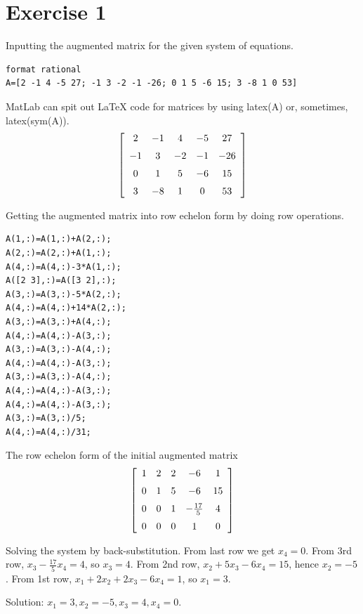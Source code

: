 \documentclass{article}
\begin{document}

\section*{Exercise 1}

Inputting the augmented matrix for the given system of equations.
\begin{verbatim}
format rational
A=[2 -1 4 -5 27; -1 3 -2 -1 -26; 0 1 5 -6 15; 3 -8 1 0 53]
\end{verbatim}
MatLab can spit out LaTeX code for matrices by using latex(A) or, sometimes, latex(sym(A)).
\begin{align*}
 \left[ \begin {array}{ccccc} 2&-1&4&-5&27\\\noalign{\medskip}-1&3&-2&-1&-26\\\noalign{\medskip}0&1&5&-6&15\\\noalign{\medskip}3&-8&1&0&53\end {array} \right] 
\end{align*}

Getting the augmented matrix into row echelon form by doing row operations.
\begin{verbatim}
A(1,:)=A(1,:)+A(2,:);
A(2,:)=A(2,:)+A(1,:);
A(4,:)=A(4,:)-3*A(1,:);
A([2 3],:)=A([3 2],:);
A(3,:)=A(3,:)-5*A(2,:);
A(4,:)=A(4,:)+14*A(2,:);
A(3,:)=A(3,:)+A(4,:);
A(4,:)=A(4,:)-A(3,:);
A(3,:)=A(3,:)-A(4,:);
A(4,:)=A(4,:)-A(3,:);
A(3,:)=A(3,:)-A(4,:);
A(4,:)=A(4,:)-A(3,:);
A(4,:)=A(4,:)-A(3,:);
A(3,:)=A(3,:)/5;
A(4,:)=A(4,:)/31;
\end{verbatim}
The row echelon form of the initial augmented matrix
\begin{align*}
 \left[ \begin {array}{ccccc} 1&2&2&-6&1\\\noalign{\medskip}0&1&5&-6&15\\\noalign{\medskip}0&0&1&-{\frac {17}{5}}&4\\\noalign{\medskip}0&0&0&1&0\end {array} \right] 
\end{align*}
 
Solving the system by back-substitution.
From last row we get $x_4 = 0$.
From 3rd row, $x_3 - \frac{17}{5}x_4 = 4$, so $x_3 = 4$.
From 2nd row, $x_2 + 5x_3 -6x_4 = 15$, hence $x_2 = -5$.
From 1st row, $x_1 + 2x_2 + 2x_3 - 6x_4 = 1$, so $x_1 = 3$.

Solution: $x_1 = 3, x_2 = -5, x_3 = 4, x_4 = 0$.
\end{document}
